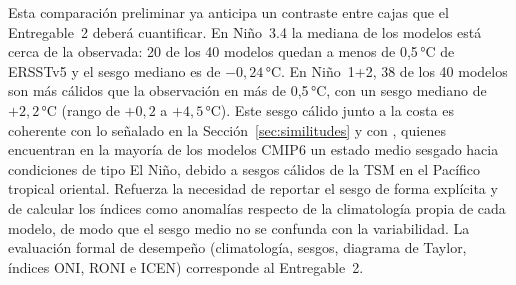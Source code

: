 Esta comparación preliminar ya anticipa un contraste entre cajas que el Entregable~2 deberá cuantificar. En Niño~3.4 la mediana de los modelos está cerca de la observada: 20 de los 40 modelos quedan a menos de 0{,}5\,°C de ERSSTv5 y el sesgo mediano es de $-0{,}24$\,°C. En Niño~1+2, 38 de los 40 modelos son más cálidos que la observación en más de 0{,}5\,°C, con un sesgo mediano de $+2{,}2$\,°C (rango de $+0{,}2$ a $+4{,}5$\,°C). Este sesgo cálido junto a la costa es coherente con lo señalado en la Sección~\ref{sec:similitudes} y con \citet{erickson2023}, quienes encuentran en la mayoría de los modelos CMIP6 un estado medio sesgado hacia condiciones de tipo El Niño, debido a sesgos cálidos de la TSM en el Pacífico tropical oriental. Refuerza la necesidad de reportar el sesgo de forma explícita y de calcular los índices como anomalías respecto de la climatología propia de cada modelo, de modo que el sesgo medio no se confunda con la variabilidad. La evaluación formal de desempeño (climatología, sesgos, diagrama de Taylor, índices ONI, RONI e ICEN) corresponde al Entregable~2.
